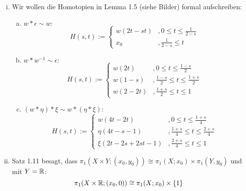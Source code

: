 \documentclass{scrartcl}
\begin{document}
\setcounter{section}{10}
\begin{aufgabe}
\begin{enumerate}[(i)]
 \item Wir wollen die Homotopien in Lemma 1.5 (siehe Bilder) formal aufschreiben:
\begin{enumerate}[a)]
\item
$
 w*\epsilon \sim w:
$
\[
 H(s,t):=\begin{cases} w(2t-st) &, 0 \le t \le \frac{1}{2-s}\\ x_0 &, \frac{1}{2-s}\le t \end{cases}
\]
\item $w*w^{-1} \sim \epsilon:$
\[
 H(s,t):=\begin{cases} w(2t) &, 0 \le t \le \frac{1-s}{2}\\ w(1-s)&, \frac{1-s}{2}\le t \le \frac{1+s}{2}\\ w(2-2t)&, \frac{1+s}{2}\le t \le 1 \end{cases}
\]
\item $(w*\eta)*\xi \sim w *(\eta*\xi)$:
\[
 H(s,t):=\begin{cases} w(4t-2t)&, 0 \le t \le \frac{1+s}{4} \\ \eta(4t-s-1) &, \frac{1+s}{4} \le t \le \frac{2+s}{4} \\ \xi(2t-2s+2st-1)&, \frac{2+s}{4} \le t \le 1 \end{cases}
\]
\end{enumerate}
\item Satz 1.11 besagt, dass $\pi_1(X\times Y; (x_0, y_0)) \cong \pi_1(X;x_0) \times \pi_1(Y, y_0)$ und mit $Y=\mathbb{R}$:
\[
 \pi_1(X\times \mathbb{R};(x_0,0)) \cong \pi_1(X;x_0) \times \{ 1 \}
\]
\end{enumerate}
\end{aufgabe}
\end{document}
